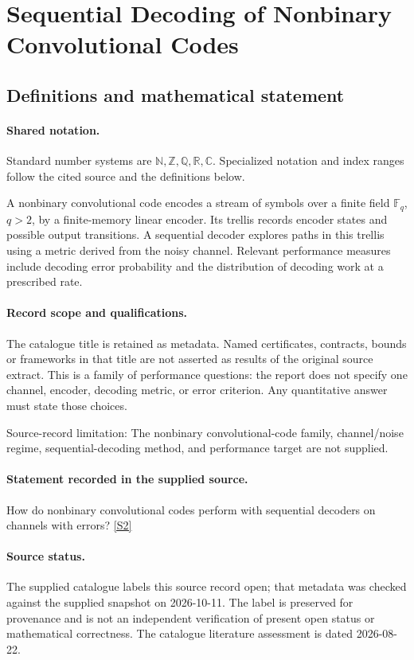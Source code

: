 \documentclass[11pt]{article}
\newcommand{\sref}[2]{\hyperlink{source:#1:#2}{[S#2]}}
\begin{document}
\section{Sequential Decoding of Nonbinary Convolutional Codes}\label{statement}

\subsection{Definitions and mathematical statement}

\paragraph{Shared notation.}Standard number systems are $\mathbb N,\mathbb Z,\mathbb Q,\mathbb R,\mathbb C$. Specialized notation and index ranges follow the cited source and the definitions below.


A nonbinary convolutional code encodes a stream of symbols over a finite field $\mathbb F_q$, $q>2$, by a finite-memory linear encoder. Its trellis records encoder states and possible output transitions. A sequential decoder explores paths in this trellis using a metric derived from the noisy channel. Relevant performance measures include decoding error probability and the distribution of decoding work at a prescribed rate.
\paragraph{Record scope and qualifications.}
The catalogue title is retained as metadata. Named certificates, contracts, bounds or frameworks in that title are not asserted as results of the original source extract.
This is a family of performance questions: the report does not specify one channel, encoder, decoding metric, or error criterion. Any quantitative answer must state those choices.

Source-record limitation: The nonbinary convolutional-code family, channel/noise regime, sequential-decoding method, and performance target are not supplied.
\paragraph{Statement recorded in the supplied source.}
How do nonbinary convolutional codes perform with sequential decoders on channels with errors? \sref{statement}{2}
\paragraph{Source status.}
The supplied catalogue labels this source record open; that metadata was checked against the supplied snapshot on 2026-10-11. The label is preserved for provenance and is not an independent verification of present open status or mathematical correctness. The catalogue literature assessment is dated 2026-08-22.
\end{document}
